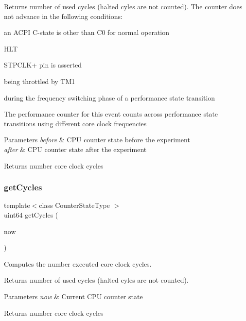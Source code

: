 Returns number of used cycles (halted cyles are not counted). The counter does not advance in the following conditions\+:
\begin{DoxyItemize}
\item an A\+C\+PI C-\/state is other than C0 for normal operation
\item H\+LT
\item S\+T\+P\+C\+L\+K+ pin is asserted
\item being throttled by T\+M1
\item during the frequency switching phase of a performance state transition
\end{DoxyItemize}

The performance counter for this event counts across performance state transitions using different core clock frequencies


\begin{DoxyParams}{Parameters}
{\em before} & C\+PU counter state before the experiment \\
\hline
{\em after} & C\+PU counter state after the experiment \\
\hline
\end{DoxyParams}
\begin{DoxyReturn}{Returns}
number core clock cycles 
\end{DoxyReturn}
\mbox{\label{classBasicCounterState_adc17d576ecaf02cf98cebc86329bf2a1}} 
\subsubsection{get\+Cycles\hspace{0.1cm}{\footnotesize\ttfamily [2/2]}}
{\footnotesize\ttfamily template$<$class Counter\+State\+Type $>$ \\
uint64 get\+Cycles (\begin{DoxyParamCaption}\item[{const Counter\+State\+Type \&}]{now }\end{DoxyParamCaption})\hspace{0.3cm}{\ttfamily [friend]}}



Computes the number executed core clock cycles. 

Returns number of used cycles (halted cyles are not counted).


\begin{DoxyParams}{Parameters}
{\em now} & Current C\+PU counter state \\
\hline
\end{DoxyParams}
\begin{DoxyReturn}{Returns}
number core clock cycles 
\end{DoxyReturn}
\mbox{\label{classBasicCounterState_a159a6896f5ef3626b88cdd27a3c15ac0}} 
